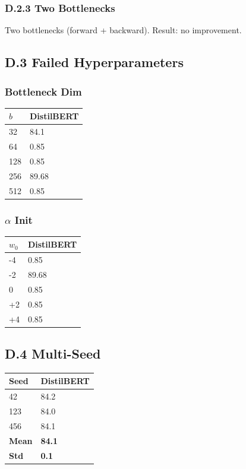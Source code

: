 \subsubsection{D.2.3 Two Bottlenecks}

Two bottlenecks (forward + backward). Result: no improvement.

\subsection{D.3 Failed Hyperparameters}

\subsubsection{Bottleneck Dim}

\begin{table}[H]
\centering
\small
\begin{tabular}{ll}
\toprule
\textbf{$b$} & \textbf{DistilBERT} \\
\midrule
32 & 84.1 \\
64 & 0.85 \\
128 & 0.85 \\
256 & 89.68 \\
512 & 0.85 \\
\bottomrule
\end{tabular}
\end{table}

\subsubsection{$\alpha$ Init}

\begin{table}[H]
\centering
\small
\begin{tabular}{ll}
\toprule
\textbf{$w_0$} & \textbf{DistilBERT} \\
\midrule
-4 & 0.85 \\
-2 & 89.68 \\
0 & 0.85 \\
+2 & 0.85 \\
+4 & 0.85 \\
\bottomrule
\end{tabular}
\end{table}

\subsection{D.4 Multi-Seed}

\begin{table}[H]
\centering
\small
\begin{tabular}{ll}
\toprule
\textbf{Seed} & \textbf{DistilBERT} \\
\midrule
42 & 84.2 \\
123 & 84.0 \\
456 & 84.1 \\
\textbf{Mean} & \textbf{84.1} \\
\textbf{Std} & \textbf{0.1} \\
\bottomrule
\end{tabular}
\end{table}

